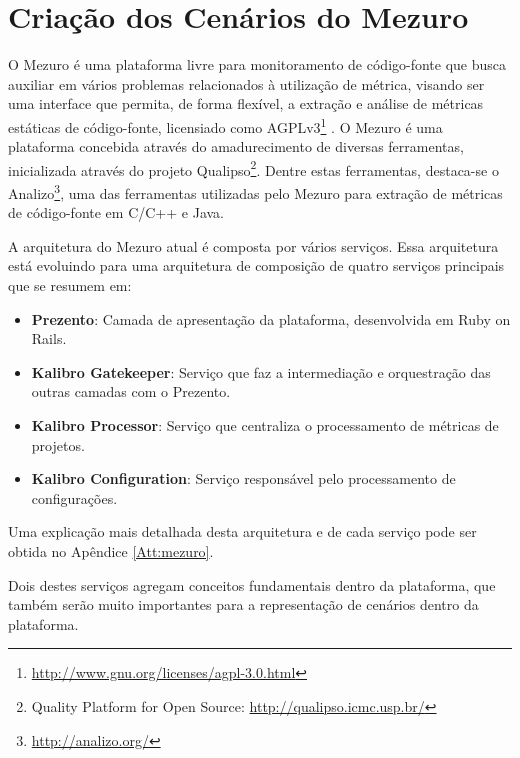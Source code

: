 \section{Criação dos Cenários do Mezuro}
\label{mezuro-cenarios}

O Mezuro é uma plataforma livre para monitoramento de código-fonte que busca auxiliar em vários problemas relacionados à utilização de métrica, visando ser uma interface que permita, de forma flexível, a extração e análise de métricas estáticas de código-fonte, licensiado como AGPLv3\footnote{\url{http://www.gnu.org/licenses/agpl-3.0.html}} \cite{manzo2014}. O Mezuro é uma plataforma concebida através do amadurecimento de diversas ferramentas, inicializada através do projeto Qualipso\footnote{Quality Platform for Open Source: \url{http://qualipso.icmc.usp.br/}}. Dentre estas ferramentas, destaca-se o Analizo\footnote{\url{http://analizo.org/}}, uma das ferramentas utilizadas pelo Mezuro para extração de métricas de código-fonte em C/C++ e Java.

A arquitetura do Mezuro atual é composta por vários serviços. Essa arquitetura está evoluindo para uma arquitetura de composição de quatro serviços principais que se resumem em:

\begin{itemize}
\item \textbf{Prezento}: Camada de apresentação da plataforma, desenvolvida em Ruby on Rails.

\item \textbf{Kalibro Gatekeeper}: Serviço que faz a intermediação e orquestração das outras camadas com o Prezento.

\item \textbf{Kalibro Processor}: Serviço que centraliza o processamento de métricas de projetos.

\item \textbf{Kalibro Configuration}: Serviço responsável pelo processamento de configurações.
\end{itemize}

Uma explicação mais detalhada desta arquitetura e de cada serviço pode ser obtida no Apêndice \ref{Att:mezuro}.

Dois destes serviços agregam conceitos fundamentais dentro da plataforma, que também serão muito importantes para a representação de cenários dentro da plataforma. 

